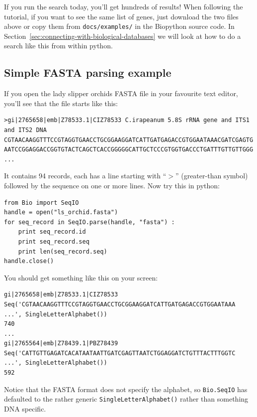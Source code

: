 \documentclass{report}
\begin{document}

If you run the search today, you'll get hundreds of results!  When following the tutorial, if you want to see the same list of genes, just download the two files above or copy them from \verb|docs/examples/| in the Biopython source code.  In Section~\ref{sec:connecting-with-biological-databases} we will look at how to do a search like this from within python.

\subsection{Simple FASTA parsing example}
\label{sec:fasta-parsing}

If you open the lady slipper orchids FASTA file in your favourite text editor, you'll see that the file starts like this:

\begin{verbatim}
>gi|2765658|emb|Z78533.1|CIZ78533 C.irapeanum 5.8S rRNA gene and ITS1 and ITS2 DNA
CGTAACAAGGTTTCCGTAGGTGAACCTGCGGAAGGATCATTGATGAGACCGTGGAATAAACGATCGAGTG
AATCCGGAGGACCGGTGTACTCAGCTCACCGGGGGCATTGCTCCCGTGGTGACCCTGATTTGTTGTTGGG
...
\end{verbatim}

It contains 94 records, each has a line starting with ``$>$'' (greater-than symbol) followed by the sequence on one or more lines.  Now try this in python:

\begin{verbatim}
from Bio import SeqIO
handle = open("ls_orchid.fasta")
for seq_record in SeqIO.parse(handle, "fasta") :
    print seq_record.id
    print seq_record.seq
    print len(seq_record.seq)
handle.close()
\end{verbatim}

\noindent You should get something like this on your screen:

\begin{verbatim}
gi|2765658|emb|Z78533.1|CIZ78533
Seq('CGTAACAAGGTTTCCGTAGGTGAACCTGCGGAAGGATCATTGATGAGACCGTGGAATAAA ...', SingleLetterAlphabet())
740
...
gi|2765564|emb|Z78439.1|PBZ78439
Seq('CATTGTTGAGATCACATAATAATTGATCGAGTTAATCTGGAGGATCTGTTTACTTTGGTC ...', SingleLetterAlphabet())
592
\end{verbatim}

Notice that the FASTA format does not specify the alphabet, so \verb|Bio.SeqIO| has defaulted to the rather generic \verb|SingleLetterAlphabet()| rather than something DNA specific.
\end{document}
